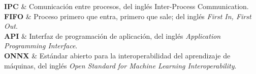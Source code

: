 \documentclass[hidelinks, letterpaper, 12pt, oneside]{tesis}
\begin{document}
{    \textbf{IPC}  & Comunicación entre procesos, del inglés Inter-Process Communication.  \\

    \textbf{FIFO} & Proceso primero que entra, primero que sale; del inglés \textit{First In, First Out}. \\

    \textbf{API} & Interfaz de programación de aplicación, del inglés \textit{Application Programming Interface}. \\
    
    \textbf{ONNX} & Estándar abierto para la interoperabilidad del aprendizaje de máquinas, del inglés \textit{Open Standard for Machine Learning Interoperability}. \\
    
    
    \hline
}


\pagestyle{empty}


\mainmatter
\pagestyle{fancy}









\label{Bibliography}

%



\appendix


\backmatter
\end{document}
